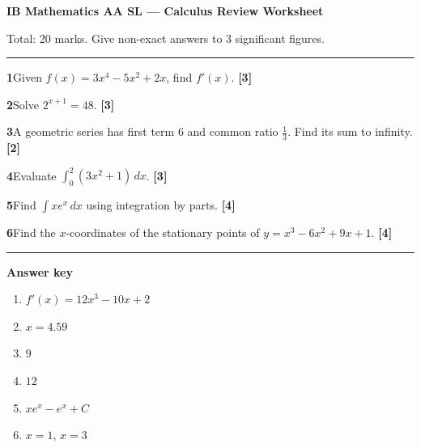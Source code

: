 \documentclass[11pt,a4paper]{article}
\newcommand{\qmarks}[1]{\hfill\textbf{[#1]}}
\begin{document}
{\Large\bfseries IB Mathematics AA SL --- Calculus Review Worksheet}\par\vspace{2mm}
Total: 20 marks. Give non-exact answers to 3 significant figures.\par\vspace{4mm}\hrule\vspace{4mm}

\textbf{1}\quad Given $f(x) = 3x^4 - 5x^2 + 2x$, find $f'(x)$. \qmarks{3}\par\vspace{5mm}
\textbf{2}\quad Solve $2^{x+1} = 48$. \qmarks{3}\par\vspace{5mm}
\textbf{3}\quad A geometric series has first term $6$ and common ratio $\tfrac13$. Find its sum to infinity. \qmarks{2}\par\vspace{5mm}
\textbf{4}\quad Evaluate $\displaystyle\int_0^2 (3x^2 + 1)\,dx$. \qmarks{3}\par\vspace{5mm}
\textbf{5}\quad Find $\displaystyle\int x e^{x}\,dx$ using integration by parts. \qmarks{4}\par\vspace{5mm}
\textbf{6}\quad Find the $x$-coordinates of the stationary points of $y = x^3 - 6x^2 + 9x + 1$. \qmarks{4}\par\vspace{8mm}

\hrule\vspace{3mm}
{\large\bfseries Answer key}\par\vspace{2mm}
\begin{enumerate}[nosep]
\item $f'(x) = 12x^3 - 10x + 2$
\item $x = 4.59$
\item $9$
\item $12$
\item $xe^x - e^x + C$
\item $x = 1$, $x = 3$
\end{enumerate}
\end{document}
